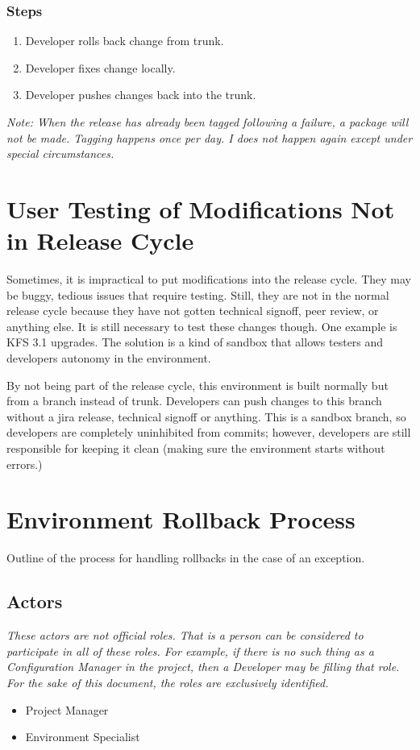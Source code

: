 \documentclass[12pt,notitlepage]{article}
\begin{document}
\subsubsection{Steps}
\begin{enumerate}
\item Developer rolls back change from trunk.
\item Developer fixes change locally.
\item Developer pushes changes back into the trunk.
\end{enumerate}

\emph{Note: When the release has already been tagged following a failure, a package will not be made. Tagging 
happens once per day. I does not happen again except under special circumstances.}

\section{User Testing of Modifications Not in Release Cycle}
Sometimes, it is impractical to put modifications into the release cycle. They may be
buggy, tedious issues that require testing. Still, they are not in the normal release
cycle because they have not gotten technical signoff, peer review, or anything else. It 
is still necessary to test these changes though. One example is KFS 3.1 upgrades. The
solution is a kind of sandbox that allows testers and developers autonomy in the environment.

By not being part of the release cycle, this environment is built normally but from a branch
instead of trunk. Developers can push changes to this branch without a jira release, technical
signoff or anything. This is a sandbox branch, so developers are completely uninhibited from 
commits; however, developers are still responsible for keeping it clean (making sure the 
environment starts without errors.)

\section{Environment Rollback Process}
Outline of the process for handling rollbacks in the case of an exception.
\subsection{Actors}
\emph{These actors are not official roles. That is a person can be considered to
participate in all of these roles. For example, if there is no such thing as a Configuration
Manager in the project, then a Developer may be filling that role. For the sake of
this document, the roles are exclusively identified.}
\begin{itemize}
  \item Project Manager
  \item Environment Specialist
\end{itemize}
\end{document}
